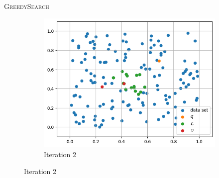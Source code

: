 \begin{frame}{\textsc{GreedySearch}}
\begin{figure}[h]
\begin{subfigure}{0.31\textwidth}
            \includegraphics[width=\textwidth]{images/greedy-search-2}
            \caption{Iteration 2}
        \end{subfigure}
        \hfill
    \end{figure}
\end{frame}

